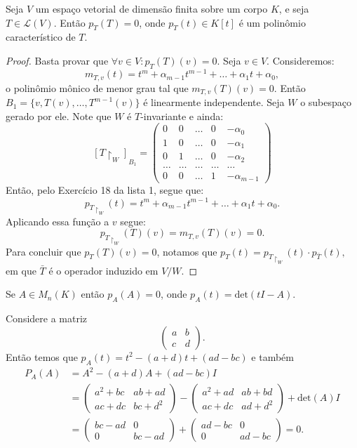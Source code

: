 \documentclass[11pt,twoside,a4paper]{book}
\begin{document}
\begin{teorema}\label{cayley-hamilton}
Seja \(V\) um espaço vetorial de dimensão finita sobre um corpo \(K\), e seja \(T\in\mathcal{L}(V)\). Então \(p_T(T)=0\), onde \(p_T(t)\in K[t]\) é um polinômio característico de \(T\). 
\end{teorema}
\begin{proof}
Basta provar que \(\forall v\in V:p_T(T)(v)=0\). Seja $v\in V$. Consideremos:
\[
m_{T,v}(t)=t^m+\alpha_{m-1}t^{m-1}+\dots+\alpha_1 t+\alpha_0,
\]
o polinômio mônico de menor grau tal que \(m_{T,v}(T)(v)=0\). Então \(B_1=\{v,T(v),\ldots, T^{m-1}(v)\}\) é linearmente independente. Seja \(W\) o subespaço gerado por ele. Note que \(W\) é \(T\)-invariante e ainda:
\[[T\upharpoonright_W]_{B_1}=\begin{pmatrix}
0 & 0 & \ldots& 0 & -\alpha_0
\\ 1 & 0 & \ldots & 0 & -\alpha_1
\\ 0 & 1 & \ldots & 0 & -\alpha_2
\\ \ldots & \ldots  & \ldots  & \ldots  & \ldots \
\\ 0 & 0 & \ldots & 1 & -\alpha_{m-1} 
\end{pmatrix}\]
Então, pelo Exercício 18 da lista 1, segue que:
\[
p_{T \upharpoonright_{W}}(t)=
t^m + \alpha_{m-1}t^{m-1} + \ldots + \alpha_1t+\alpha_0.\]
Aplicando essa função a \(v\) segue:
\[p_{T \upharpoonright_{W}}(T)(v)=m_{T,v}(T)(v)=0.\]
Para concluir que \(p_T(T)(v)=0\), notamos que \(p_T(t)=p_{T\upharpoonright_W}(t)\cdot p_{\bar{T}}(t),\) em que $\bar{T}$ é o operador induzido em $V/W$.
\end{proof}
\begin{corolario}
Se \(A\in M_n(K)\) então \(p_A(A)=0\),
onde \(p_A(t)=\text{det}(tI -A)\). \end{corolario}

\begin{exemplo}
Considere a matriz\[\begin{pmatrix}
a & b \\ c & d
\end{pmatrix}.\]
Então temos que \(p_A(t)=t^2-(a+d)t+(ad-bc)\) e também
\begin{align*}
P_A(A)&=A^2-(a+d)A+(ad-bc)I\\
&=
\begin{pmatrix} a^2+bc & ab+ad\\ac+dc & bc+d^2\end{pmatrix}
-\begin{pmatrix} a^2+ad & ab+bd \\ ac+dc & ad+d^2\end{pmatrix}
+ \text{det}(A)I
\\&=\begin{pmatrix}bc-ad & 0 \\ 0 & bc- ad\end{pmatrix}
+ \begin{pmatrix}ad-bc & 0 \\ 0 & ad - bc\end{pmatrix} = 0.
\end{align*}
\end{exemplo}
\end{document}
